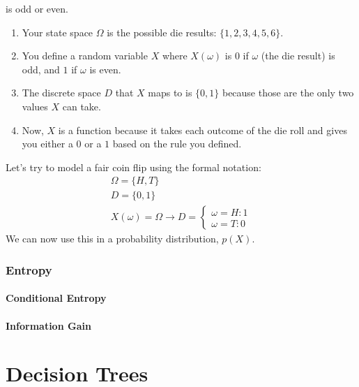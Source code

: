 \documentclass{mlnotes}
\begin{document}
is odd or even.
\begin{enumerate}
  \item Your state space \(\Omega\) is the possible die results: \(\{1,2,3,4,5,6\}\).
  \item You define a random variable \(X\) where \(X(\omega)\) is \(0\) if
  \(\omega\) (the die result) is odd, and \(1\) if \(\omega\) is even.
  \item The discrete space \(D\) that \(X\) maps to is \(\{0,1\}\) because those
  are the only two values \(X\) can take.
  \item Now, \(X\) is a function because it takes each outcome of the die roll
  and gives you either a \(0\) or a \(1\) based on the rule you defined.
\end{enumerate}
\vspace{12pt}
Let's try to model a fair coin flip using the formal notation:
\begin{gather*}
  \Omega=\{H,T\}\\
  D=\{0,1\}\\
  X(\omega) = \Omega \rightarrow D = \begin{cases}
    \omega = H : 1\\
    \omega = T : 0
  \end{cases}
\end{gather*}
\vspace{12pt}
We can now use this in a probability distribution, \(p(X)\).


\section{Entropy}
\subsection{Conditional Entropy}
\subsection{Information Gain}

\part{Decision Trees}

\printindex[defn]
\end{document}
